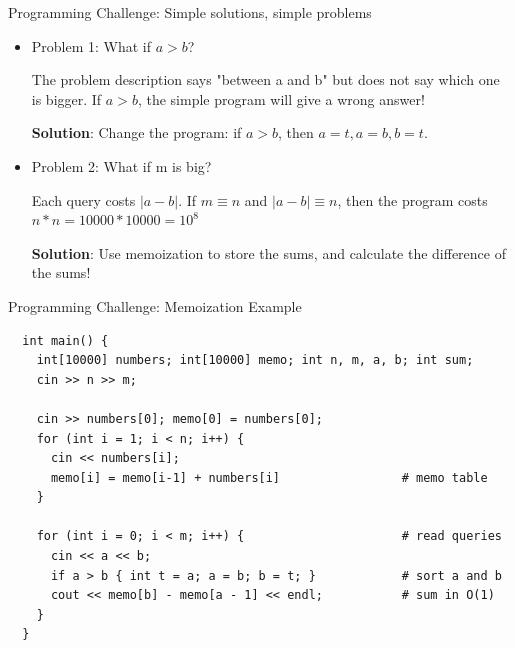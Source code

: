 \begin{frame}[t]{Programming Challenge: Simple solutions, simple problems}

  \begin{itemize}
  \item Problem 1: What if \alert{$a > b$}?\medskip
  
  The problem description says "\alert{between a and b}" but does not say which one is bigger. If $a > b$, \alert{the simple program will give a wrong answer!}\medskip
  
  {\bf Solution}: Change the program: if $a > b$, then $a = t, a = b, b = t$.
  \bigskip

  
  \item Problem 2: What if \alert{m is big}?\medskip
  
  Each query costs $|a-b|$. If $m \equiv n$ and $|a-b| \equiv n$, then the program costs $n * n = 10000 * 10000 = 10^{8}$\medskip

  {\bf Solution}: Use \alert{memoization} to store the sums, and calculate the difference of the sums!

  \end{itemize}
\bigskip
\end{frame}

\begin{frame}[fragile,t]{Programming Challenge: Memoization Example}

  {\smaller
  \begin{verbatim}
  int main() {
    int[10000] numbers; int[10000] memo; int n, m, a, b; int sum;
    cin >> n >> m;

    cin >> numbers[0]; memo[0] = numbers[0];
    for (int i = 1; i < n; i++) { 
      cin << numbers[i]; 
      memo[i] = memo[i-1] + numbers[i]                 # memo table
    }

    for (int i = 0; i < m; i++) {                      # read queries
      cin << a << b; 
      if a > b { int t = a; a = b; b = t; }            # sort a and b
      cout << memo[b] - memo[a - 1] << endl;           # sum in O(1)
    }
  }
  \end{verbatim}}
\end{frame}

